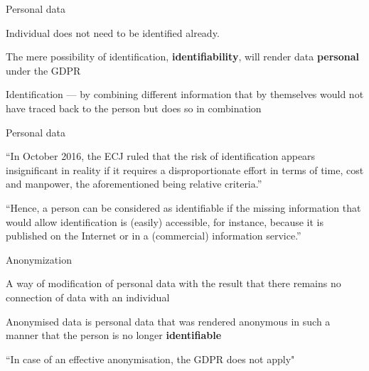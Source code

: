 \documentclass[12pt,aspectratio=169,handout]{beamer}
\begin{document}
\begin{frame}{Personal data}

Individual does not need to be identified already.

The mere possibility of identification, \textbf{identifiability}, will render data \textbf{personal} under the GDPR

Identification --- by combining different information that by themselves would not have traced back to the person but does so in combination

\end{frame}

\begin{frame}{Personal data}

``In October 2016, the ECJ ruled that the risk of identification appears insignificant in reality if it requires a disproportionate effort in terms of time, cost and manpower, the aforementioned being relative criteria.''

``Hence, a person can be considered as identifiable if the missing information that would allow identification is (easily) accessible, for instance, because it is published on the Internet or in a (commercial) information service.''

\citep[p.~12]{Voigt.Bussche.2017}

\end{frame}



\begin{frame}{Anonymization}

A way of modification of personal data with the result that there remains no connection of data with an individual

Anonymised data is personal data that was rendered anonymous in such a manner that the person is no longer \textbf{identifiable}

``In case of an effective anonymisation, the GDPR does not apply"

\citep[p.~13]{Voigt.Bussche.2017}

\end{frame}
\end{document}

